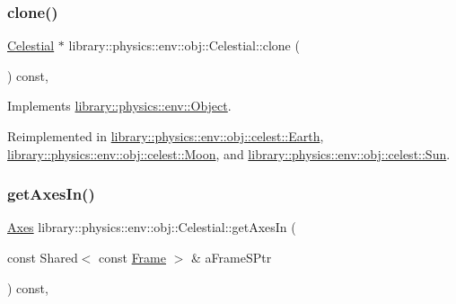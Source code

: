 \subsubsection{\texorpdfstring{clone()}{clone()}}
{\footnotesize\ttfamily \hyperlink{classlibrary_1_1physics_1_1env_1_1obj_1_1_celestial}{Celestial} $\ast$ library\+::physics\+::env\+::obj\+::\+Celestial\+::clone (\begin{DoxyParamCaption}{ }\end{DoxyParamCaption}) const\hspace{0.3cm}{\ttfamily [override]}, {\ttfamily [virtual]}}



Implements \hyperlink{classlibrary_1_1physics_1_1env_1_1_object_a498e0d1a15e937a5aa77374c6f899768}{library\+::physics\+::env\+::\+Object}.



Reimplemented in \hyperlink{classlibrary_1_1physics_1_1env_1_1obj_1_1celest_1_1_earth_aca39bec00a2046a3fcef9bf22be52428}{library\+::physics\+::env\+::obj\+::celest\+::\+Earth}, \hyperlink{classlibrary_1_1physics_1_1env_1_1obj_1_1celest_1_1_moon_a9d922ab338809a6c1052edbe11ce3e60}{library\+::physics\+::env\+::obj\+::celest\+::\+Moon}, and \hyperlink{classlibrary_1_1physics_1_1env_1_1obj_1_1celest_1_1_sun_a79fa2d336dad399c3d933b0f5a2f9427}{library\+::physics\+::env\+::obj\+::celest\+::\+Sun}.

\mbox{\label{classlibrary_1_1physics_1_1env_1_1obj_1_1_celestial_a51d7ed3c0dcf627fbbcd81f9b190fb6b}} 
\subsubsection{\texorpdfstring{get\+Axes\+In()}{getAxesIn()}}
{\footnotesize\ttfamily \hyperlink{classlibrary_1_1physics_1_1coord_1_1_axes}{Axes} library\+::physics\+::env\+::obj\+::\+Celestial\+::get\+Axes\+In (\begin{DoxyParamCaption}\item[{const Shared$<$ const \hyperlink{classlibrary_1_1physics_1_1coord_1_1_frame}{Frame} $>$ \&}]{a\+Frame\+S\+Ptr }\end{DoxyParamCaption}) const\hspace{0.3cm}{\ttfamily [override]}, {\ttfamily [virtual]}}



